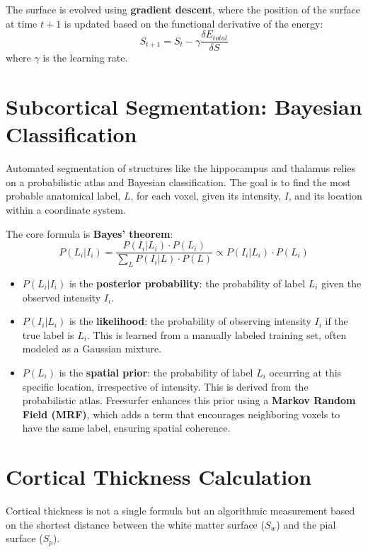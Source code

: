 \documentclass[12pt]{article}
\begin{document}
The surface is evolved using \textbf{gradient descent}, where the position of the surface at time $t+1$ is updated based on the functional derivative of the energy:
\begin{equation}
S_{t+1} = S_t - \gamma \frac{\delta E_{total}}{\delta S}
\end{equation}
where $\gamma$ is the learning rate.

\section{Subcortical Segmentation: Bayesian Classification}

Automated segmentation of structures like the hippocampus and thalamus relies on a probabilistic atlas and Bayesian classification. The goal is to find the most probable anatomical label, $L$, for each voxel, given its intensity, $I$, and its location within a coordinate system.

The core formula is \textbf{Bayes' theorem}:
\begin{equation}
P(L_i | I_i) = \frac{P(I_i | L_i) \cdot P(L_i)}{\sum_{L} P(I_i | L) \cdot P(L)} \propto P(I_i | L_i) \cdot P(L_i)
\end{equation}
\begin{itemize}
    \item $P(L_i | I_i)$ is the \textbf{posterior probability}: the probability of label $L_i$ given the observed intensity $I_i$.
    \item $P(I_i | L_i)$ is the \textbf{likelihood}: the probability of observing intensity $I_i$ if the true label is $L_i$. This is learned from a manually labeled training set, often modeled as a Gaussian mixture.
    \item $P(L_i)$ is the \textbf{spatial prior}: the probability of label $L_i$ occurring at this specific location, irrespective of intensity. This is derived from the probabilistic atlas. Freesurfer enhances this prior using a \textbf{Markov Random Field (MRF)}, which adds a term that encourages neighboring voxels to have the same label, ensuring spatial coherence.
\end{itemize}

\section{Cortical Thickness Calculation}

Cortical thickness is not a single formula but an algorithmic measurement based on the shortest distance between the white matter surface ($S_w$) and the pial surface ($S_p$).
\end{document}
